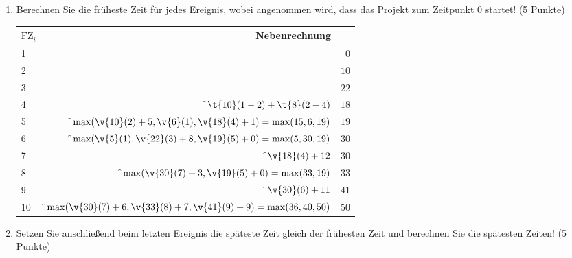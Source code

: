 \documentclass{lehramt-informatik-aufgabe}
\begin{document}
\begin{enumerate}


\item Berechnen Sie die früheste Zeit für jedes Ereignis, wobei
angenommen wird, dass das Projekt zum Zeitpunkt 0 startet! (5 Punkte)

\begin{antwort}
\begin{tabular}{|l|r|r|}
\hline
$\text{FZ}_i$ & Nebenrechnung & \\\hline\hline
1 &                                                                           & $0$ \\\hline
2 &                                                                           & $10$ \\\hline
3 &                                                                           & $22$ \\\hline
4 & \f$\t{10}(1-2) + \t{8}(2-4) $                                             & $18$ \\\hline
5 & \f$\max(\v{10}(2) + 5,\v{6}(1),\v{18}(4) + 1) = \max(15,6,19)$            & $19$ \\\hline
6 & \f$\max(\v{5}(1),\v{22}(3) + 8, \v{19}(5) + 0) = \max(5, 30, 19)$         & $30$ \\\hline
7 & \f$\v{18}(4) + 12$                                                        & $30$ \\\hline
8 & \f$\max(\v{30}(7) + 3, \v{19}(5) + 0) = \max(33,19)$                      & $33$ \\\hline
9 & \f$\v{30}(6) + 11$                                                        & $41$ \\\hline
10 & \f$\max(\v{30}(7) + 6, \v{33}(8) + 7, \v{41}(9) + 9) = \max(36, 40, 50)$ & $50$ \\\hline
\end{tabular}
\end{antwort}


\item Setzen Sie anschließend beim letzten Ereignis die späteste Zeit
gleich der frühesten Zeit und berechnen Sie die spätesten Zeiten! (5
Punkte)


\end{enumerate}
\end{document}
